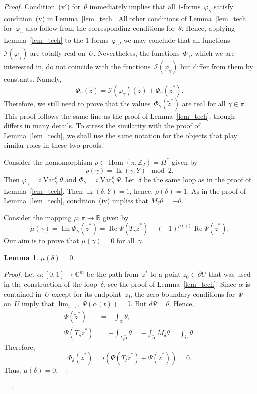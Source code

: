 \documentclass[reqno,tbtags,12pt]{amsart}
\numberwithin{equation}{section}
\newcommand{\R}{\mathbb{R}}
\newcommand{\C}{\mathbb{C}}
\newcommand{\Z}{\mathbb{Z}}
\newcommand{\tU}{\widetilde{U}}
\newcommand{\talpha}{\widetilde{\alpha}}
\newcommand{\I}{\mathcal{I}}
\newcommand{\tz}{\tilde{z}}
\newcommand{\Hom}{\mathop{\mathrm{Hom}}\nolimits}
\renewcommand{\Im}{\mathop{\mathrm{Im}}\nolimits}
\renewcommand{\Re}{\mathop{\mathrm{Re}}\nolimits}
\newcommand{\lk}{\mathop{\mathrm{lk}}\nolimits}
\newcommand{\Var}{\mathop{\mathrm{Var}}\nolimits}
\newtheorem{lem}[theorem]{Lemma}
\theoremstyle{definition}
\begin{document}
\begin{proof}
Condition~(v${}'$) for~$\theta$ immediately implies that all $1$-forms~$\varphi_{\gamma}$ satisfy condition~(v) in Lemma~\ref{lem_tech}. All other conditions of Lemma~\ref{lem_tech} for~$\varphi_{\gamma}$ also follow from the corresponding conditions for~$\theta$. Hence, applying Lemma~\ref{lem_tech} to the $1$-forms~$\varphi_{\gamma}$, we may conclude that all functions~$\I(\varphi_{\gamma})$ are totally real on~$U$. Nevertheless, the functions~$\Phi_{\gamma}$, which we are interested in, do not coincide with the functions~$\I(\varphi_{\gamma})$ but differ from them by constants. Namely,
\begin{equation*}
\Phi_{\gamma}(\tz)=\I(\varphi_{\gamma})(\tz)+\Phi_{\gamma}(\tz^*).
\end{equation*}
Therefore, we still need to prove that the values~$\Phi_{\gamma}(\tz^*)$ are real for all $\gamma\in\pi$. This proof follows the same line as the proof of Lemma~\ref{lem_tech}, though differs in many details. To stress the similarity with the proof of Lemma~\ref{lem_tech}, we shall use the same notation for the objects that play similar roles in these two proofs. 

Consider the homomorphism $\rho\in \Hom(\pi,\Z_2)=H^*$ given by
$$
\rho(\gamma)=\lk(\gamma,Y)\mod 2.
$$
Then $\varphi_{\gamma}=i\Var_{\gamma}^{\rho}\theta$ and $\Phi_{\gamma}=i\Var_{\gamma}^{\rho}\Psi$. Let~$\delta$ be the same loop as in the proof of Lemma~\ref{lem_tech}. Then $\lk(\delta,Y)=1$, hence, $\rho(\delta)=1$. As in the proof of Lemma~\ref{lem_tech}, condition~(iv) implies that $M_{\delta}\theta=-\theta$.

Consider the mapping $\mu\colon\pi\to\R$ given by
\begin{equation*}
\mu(\gamma)=\Im \Phi_{\gamma}(\tz^*)=\Re\Psi(T_{\gamma}\tz^*)-(-1)^{\rho(\gamma)}\Re\Psi(\tz^*).
\end{equation*}
Our aim is to prove that $\mu(\gamma)=0$ for all~$\gamma$. 

\begin{lem}\label{slem_mu_delta2}
 $\mu(\delta)=0$. 
\end{lem}
\begin{proof}
Let $\alpha\colon[0,1]\to\C^m$ be the path from~$z^*$ to a point $z_0\in\partial U$ that was used in the construction of the loop~$\delta$, see the proof of Lemma~\ref{lem_tech}. Since  $\alpha$ is contained in~$U$ except for its endpoint~$z_0$, the zero boundary conditions for~$\Psi$ on~$\tU$ imply that $\lim_{t\to 1}\Psi(\tilde\alpha(t))=0$. But $d\Psi=\theta$. Hence,
\begin{align*}
\Psi(\tz^*)&=-\int_{\talpha}\theta,\\
\Psi(T_{\delta}\tz^*)&=-\int_{T_{\delta}\talpha}\theta=-\int_{\talpha}M_{\delta}\theta=\int_{\talpha}\theta.
\end{align*}
Therefore,
$$
\Phi_{\delta}(\tz^*)=i(\Psi(T_{\delta}\tz^*)+\Psi(\tz^*))=0.
$$
Thus, $\mu(\delta)=0$.
\end{proof}


\end{proof}
\end{document}
